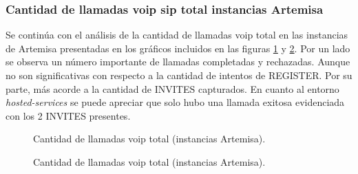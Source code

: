 \documentclass[a4paper,12pt]{report}
\begin{document}
{\subsubsection{Cantidad de llamadas \ac{voip} \ac{sip} total instancias Artemisa}

Se continúa con el análisis de la cantidad de llamadas \ac{voip} total en las 
instancias de Artemisa presentadas en los gráficos incluidos en
las figuras \ref{cant_llamadas_sip_arte_barras} y \ref{cant_llamadas_sip_arte_torta}.
Por un lado se observa un número importante de llamadas completadas y rechazadas.
Aunque no son significativas con respecto a la cantidad de intentos de
REGISTER. Por su parte, más acorde a la cantidad de \mbox{INVITES} capturados. En
cuanto al entorno \emph{hosted-services} se puede apreciar que solo hubo una
llamada exitosa evidenciada con los 2 INVITES presentes.

\begin{figure}[h!]
 \centering
 \caption{Cantidad de llamadas \ac{voip} total (instancias Artemisa).}
\label{cant_llamadas_sip_arte_barras}
\end{figure}

\begin{figure}[h!]
 \centering
 \caption{Cantidad de llamadas \ac{voip} total (instancias Artemisa).}
\label{cant_llamadas_sip_arte_torta}
\end{figure}

}
\end{document}
